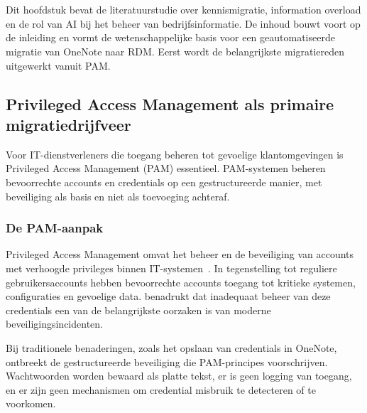 \chapter{}%
\label{ch:stand-van-zaken}



Dit hoofdstuk bevat de literatuurstudie over kennismigratie, information overload en de rol van AI bij het beheer van bedrijfsinformatie.
De inhoud bouwt voort op de inleiding en vormt de wetenschappelijke basis voor een geautomatiseerde migratie van OneNote naar RDM. Eerst wordt de belangrijkste migratiereden uitgewerkt vanuit PAM.

\section{Privileged Access Management als primaire migratiedrijfveer}
\label{sec:pam-credential-beheer}

Voor IT-dienstverleners die toegang beheren tot gevoelige klantomgevingen is Privileged Access Management (PAM) essentieel.
PAM-systemen beheren bevoorrechte accounts en credentials op een gestructureerde manier, met beveiliging als basis en niet als toevoeging achteraf.

\subsection{De PAM-aanpak}
\label{subsec:pam-aanpak}

Privileged Access Management omvat het beheer en de beveiliging van accounts met verhoogde privileges binnen IT-systemen~\autocite[pp.~155--161]{garbis2021pam}. 
In tegenstelling tot reguliere gebruikersaccounts hebben bevoorrechte accounts toegang tot kritieke systemen, configuraties en gevoelige data. \textcite{sizov2024pam} benadrukt dat inadequaat beheer van deze credentials een van de belangrijkste oorzaken is van moderne beveiligingsincidenten.

Bij traditionele benaderingen, zoals het opslaan van credentials in OneNote, ontbreekt de gestructureerde beveiliging die PAM-principes voorschrijven. 
Wachtwoorden worden bewaard als platte tekst, er is geen logging van toegang, en er zijn geen mechanismen om credential misbruik te detecteren of te voorkomen.

